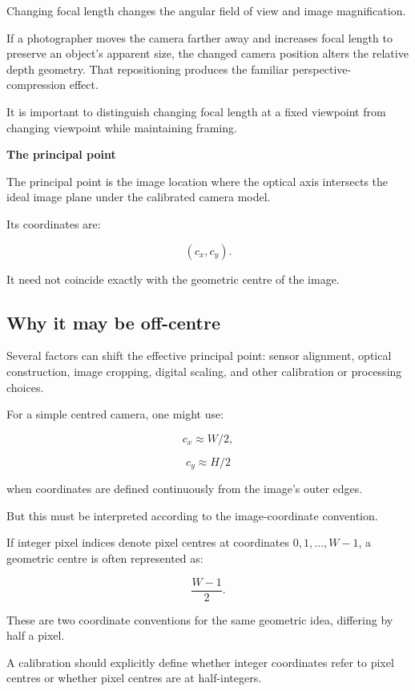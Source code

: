 Changing focal length changes the angular field of view and image magnification.

If a photographer moves the camera farther away and increases focal length to preserve an object's apparent size, the changed camera position alters the relative depth geometry. That repositioning produces the familiar perspective-compression effect.

It is important to distinguish changing focal length at a fixed viewpoint from changing viewpoint while maintaining framing.

\textbf{The principal point}

The principal point is the image location where the optical axis intersects the ideal image plane under the calibrated camera model.

Its coordinates are:

\[
 \boxed{(c_x,c_y)}.
\]

It need not coincide exactly with the geometric centre of the image.

\subsection{Why it may be off-centre}\label{02-foundations-ii-ch034-why-it-may-be-off-centre}

\hypertarget{02-foundations-ii-ch034-why-it-may-be-off-centre}{}

Several factors can shift the effective principal point: sensor alignment, optical construction, image cropping, digital scaling, and other calibration or processing choices.

For a simple centred camera, one might use:

\[
 c_x\approx W/2,
\]

\[
 c_y\approx H/2
\]

when coordinates are defined continuously from the image's outer edges.

But this must be interpreted according to the image-coordinate convention.

If integer pixel indices denote pixel centres at coordinates \(0,1,\ldots,W-1\), a geometric centre is often represented as:

\[
 \frac{W-1}{2}.
\]

These are two coordinate conventions for the same geometric idea, differing by half a pixel.

A calibration should explicitly define whether integer coordinates refer to pixel centres or whether pixel centres are at half-integers.

